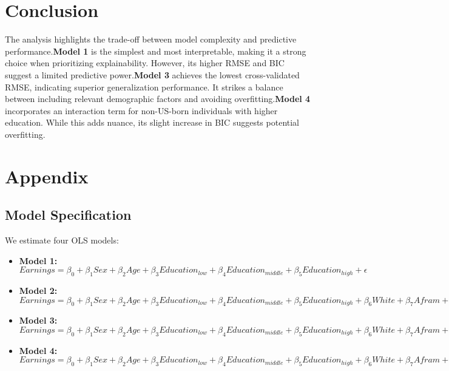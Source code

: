 \documentclass{article}
\begin{document}
\section{Conclusion}

The analysis highlights the trade-off between model complexity and predictive performance.\textbf{Model 1} is the simplest and most interpretable, making it a strong choice when prioritizing explainability. However, its higher RMSE and BIC suggest a limited predictive power.\textbf{Model 3} achieves the lowest cross-validated RMSE, indicating superior generalization performance. It strikes a balance between including relevant demographic factors and avoiding overfitting.\textbf{Model 4} incorporates an interaction term for non-US-born individuals with higher education. While this adds nuance, its slight increase in BIC suggests potential overfitting.

\section{Appendix}

\subsection{Model Specification}
We estimate four OLS models:

\begin{itemize}
    \item \textbf{Model 1:} $Earnings = \beta_0 + \beta_1 Sex + \beta_2 Age + \beta_3 Education_{low} + \beta_4 Education_{middle} + \beta_5 Education_{high} + \epsilon$
    \item \textbf{Model 2:} $Earnings = \beta_0 + \beta_1 Sex + \beta_2 Age + \beta_3 Education_{low} + \beta_4 Education_{middle} + \beta_5 Education_{high} + \beta_6 White + \beta_7 Afram + \beta_8 Asian + \beta_9 Hisp + \epsilon$
    \item \textbf{Model 3:} $Earnings = \beta_0 + \beta_1 Sex + \beta_2 Age + \beta_3 Education_{low} + \beta_4 Education_{middle} + \beta_5 Education_{high} + \beta_6 White + \beta_7 Afram + \beta_8 Asian + \beta_9 Hisp + \beta_{10} NonUSborn + \beta_{11} Married + \beta_{12} Divorced + \beta_{13} Widowed + \beta_{14} Union + \epsilon$
    \item \textbf{Model 4:} $Earnings = \beta_0 + \beta_1 Sex + \beta_2 Age + \beta_3 Education_{low} + \beta_4 Education_{middle} + \beta_5 Education_{high} + \beta_6 White + \beta_7 Afram + \beta_8 Asian + \beta_9 Hisp + \beta_{10} NonUSborn + \beta_{11} Married + \beta_{12} Divorced + \beta_{13} Widowed + \beta_{14} Union + \beta_{15} NonUS\_Education_{high} + \epsilon$
\end{itemize}
\end{document}
